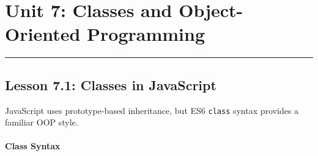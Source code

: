 \documentclass[
  justified,
  openright,
]{tufte-book}
\let\subsubsection\paragraph
\let\paragraph\paragraph
\let\subsubsection\paragraph
\let\paragraph\paragraph
\begin{document}
\section{Unit 7: Classes and Object-Oriented
Programming}\label{unit-7-classes-and-object-oriented-programming}

\begin{center}\rule{0.5\linewidth}{0.5pt}\end{center}

\subsection{Lesson 7.1: Classes in
JavaScript}\label{lesson-7.1-classes-in-javascript}

JavaScript uses prototype-based inheritance, but ES6 \texttt{class}
syntax provides a familiar OOP style.

\subsubsection{Class Syntax}\label{class-syntax}
\end{document}
